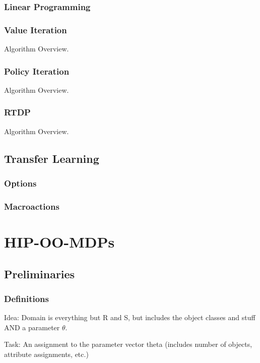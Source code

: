\documentclass[11pt]{article}
\begin{document}
\subsubsection{Linear Programming}
\subsubsection{Value Iteration}

Algorithm Overview.

\subsubsection{Policy Iteration}

Algorithm Overview.

\subsubsection{RTDP}

Algorithm Overview.


\subsection{Transfer Learning}

\subsubsection{Options}
\subsubsection{Macroactions}


\section{HIP-OO-MDPs}

\subsection{Preliminaries}

\subsubsection{Definitions}
Idea: Domain is everything but R and S, but includes the object classes and stuff AND a parameter $\theta$.

Task: An assignment to the parameter vector theta (includes number of objects, attribute assignments, etc.)
\end{document}
